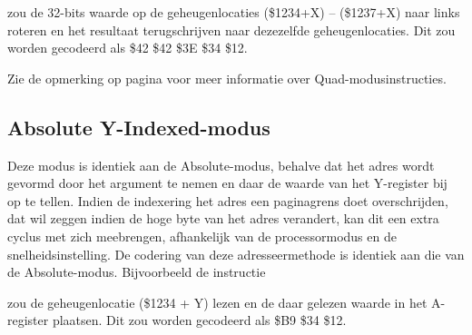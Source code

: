 zou de 32-bits waarde op de geheugenlocaties (\$1234+X) -- (\$1237+X) naar links roteren en het resultaat terugschrijven naar dezezelfde geheugenlocaties. Dit zou worden gecodeerd als \$42 \$42 \$3E \$34 \$12.

Zie de opmerking op pagina \pageref{Base-Page (Zero-Page) Quad Mode} voor meer informatie over Quad-modusinstructies.

\subsection{Absolute Y-Indexed-modus}

Deze modus is identiek aan de Absolute-modus, behalve dat het adres wordt gevormd door het argument te nemen en daar de waarde van het Y-register bij op te tellen. Indien de indexering het adres een paginagrens doet overschrijden, dat wil zeggen indien de hoge byte van het adres verandert, kan dit een extra cyclus met zich meebrengen, afhankelijk van de processormodus en de snelheidsinstelling. De codering van deze adresseermethode is identiek aan die van de Absolute-modus. Bijvoorbeeld de instructie


zou de geheugenlocatie (\$1234 + Y) lezen en de daar gelezen waarde in het A-register plaatsen. Dit zou worden gecodeerd als \$B9 \$34 \$12.

